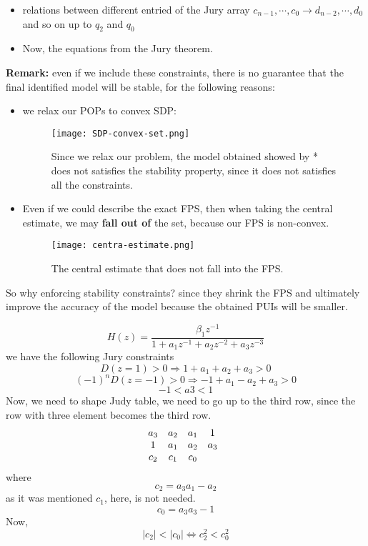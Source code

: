 \begin{enumerate}
\begin{itemize}
     \item relations between different entried of the Jury array  \(c_{n-1},\cdots,c_0 \rightarrow d_{n-2},\cdots,d_0\) and so on up to $q_2$ and $q_0$\\
     \item Now, the equations from the Jury theorem.
    \end{itemize}
    \textbf{Remark:} even if we include these constraints, there is no guarantee that the final identified model will be stable, for the following reasons:
    \begin{itemize}
        \item we relax our POPs to convex SDP:
     \begin{figure}[H]
    \centering
    \texttt{[image: SDP-convex-set.png]}
    \caption{Since we relax our problem, the model obtained showed by * does not satisfies the stability property, since it does not satisfies all the constraints.}
\end{figure}
    \item Even if we could describe the exact FPS, then when taking the central estimate, we may \textbf{fall out of} the set, because our FPS is non-convex.
    \begin{figure}[H]
    \centering
    \texttt{[image: centra-estimate.png]}
    \caption{The central estimate that does not fall into the FPS.}
\end{figure}
    \end{itemize}
    So why enforcing stability constraints? since they shrink the FPS and ultimately improve the accuracy of the model because the obtained PUIs will be smaller.
\end{enumerate}

\begin{example}
\[
H(z) = \frac{\beta_1 z^{-1}}{1 + a_1 z^{-1} + a_2 z^{-2} + a_3 z^{-3}}
\]
we have the following Jury constraints
\[
D(z=1)> 0 \Rightarrow 1 + a_1 + a_2 + a_3 > 0
\]
\[
(-1)^nD(z=-1)> 0 \Rightarrow -1 + a_1 - a_2 + a_3 > 0
\]
\[
-1 <a3< 1
\]
Now, we need to shape Judy table, we need to go up to the third row, since the row with three element becomes the third row.
\[
\begin{array}{*{4}{c}@{\hspace{10pt}}}
    a_3 & a_2 & a_1 & 1 \\
    1 & a_1 & a_2 & a_3 \\
    c_2 & c_1 & c_0  
\end{array}
\]
where 
\[
c_2 = a_3 a_1 - a_2
\]
as it was mentioned $c_1$, here, is not needed.
\[
c_0 = a_3 a_3 - 1
\]
Now,
\[
|c_2|<|c_0| \Longleftrightarrow c_2^2 <c_0^2
\]

\end{example}

















